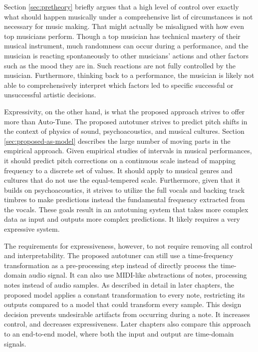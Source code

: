 Section \ref{sec:pretheory} briefly argues that a high level of control over exactly what should happen musically under a comprehensive list of circumstances is not necessary for music making. That might actually be misaligned with how even top musicians perform. Though a top musician has technical mastery of their musical instrument, much randomness can occur during a performance, and the musician is reacting spontaneously to other musicians' actions and other factors such as the mood they are in. Such reactions are not fully controlled by the musician. Furthermore, thinking back to a performance, the musician is likely not able to comprehensively interpret which factors led to specific successful or unsuccessful artistic decisions. 

Expressivity, on the other hand, is what the proposed approach strives to offer more than Auto-Tune. The proposed autotuner strives to predict pitch shifts in the context of physics of sound, psychoacoustics, and musical cultures. Section \ref{sec:proposed-as-model} describes the large number of moving parts in the empirical approach. Given empirical studies of intervals in musical performances, it should predict pitch corrections on a continuous scale instead of mapping frequency to a discrete set of values. It should apply to musical genres and cultures that do not use the equal-tempered scale. Furthermore, given that it builds on psychoacoustics, it strives to utilize the full vocals and backing track timbres to make predictions instead the fundamental frequency extracted from the vocals. These goals result in an autotuning system that takes more complex data as input and outputs more complex predictions. It likely requires a very expressive system.

The requirements for expressiveness, however, to not require removing all control and interpretability. The proposed autotuner can still use a time-frequency transformation as a pre-processing step instead of directly process the time-domain audio signal. It can also use MIDI-like abstractions of notes, processing notes instead of audio samples. As described in detail in later chapters, the proposed model applies a constant transformation to every note, restricting its outputs compared to a model that could transform every sample. This design decision prevents undesirable artifacts from occurring during a note. It increases control, and decreases expressiveness. Later chapters also compare this approach to an end-to-end model, where both the input and output are time-domain signals. 

